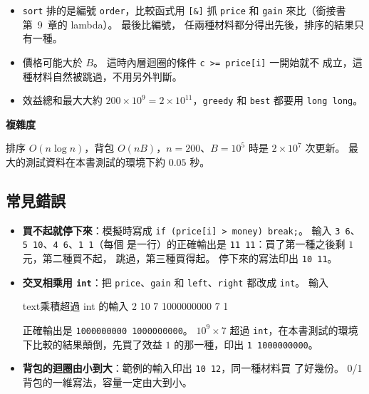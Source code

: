 
\begin{itemize}
\item \texttt{sort} 排的是編號 \texttt{order}，比較函式用 \texttt{[\&]} 抓
\texttt{price} 和 \texttt{gain} 來比（銜接書第~9~章的 lambda）。 最後比編號，
任兩種材料都分得出先後，排序的結果只有一種。
\item 價格可能大於 $B$。 這時內層迴圈的條件 \texttt{c >= price[i]} 一開始就不
成立，這種材料自然被跳過，不用另外判斷。
\item 效益總和最大大約 $200 \times 10^9 = 2 \times 10^{11}$，\texttt{greedy}
和 \texttt{best} 都要用 \texttt{long long}。
\end{itemize}

\textbf{複雜度}

排序 $O(n \log n)$，背包 $O(nB)$，$n = 200$、$B = 10^5$ 時是 $2 \times 10^7$
次更新。 最大的測試資料在本書測試的環境下約 $0.05$ 秒。

\subsection{常見錯誤}

\begin{itemize}
\item \textbf{買不起就停下來}：模擬時寫成 \texttt{if (price[i] > money)
break;}。 輸入 \texttt{3 6}、\texttt{5 10}、\texttt{4 6}、\texttt{1 1}（每個
是一行）的正確輸出是 \texttt{11 11}：買了第一種之後剩 $1$ 元，第二種買不起，
跳過，第三種買得起。 停下來的寫法印出 \texttt{10 11}。
\item \textbf{交叉相乘用 \texttt{int}}：把 \texttt{price}、\texttt{gain} 和
\texttt{left}、\texttt{right} 都改成 \texttt{int}。 輸入
\begin{code}{text}{乘積超過 int 的輸入}
2 10
7 1000000000
7 1
\end{code}
正確輸出是 \texttt{1000000000 1000000000}。 $10^9 \times 7$ 超過
\texttt{int}，在本書測試的環境下比較的結果顛倒，先買了效益 $1$ 的那一種，印出
\texttt{1 1000000000}。
\item \textbf{背包的迴圈由小到大}：範例的輸入印出 \texttt{10 12}，同一種材料買
了好幾份。 0/1 背包的一維寫法，容量一定由大到小。
\end{itemize}

